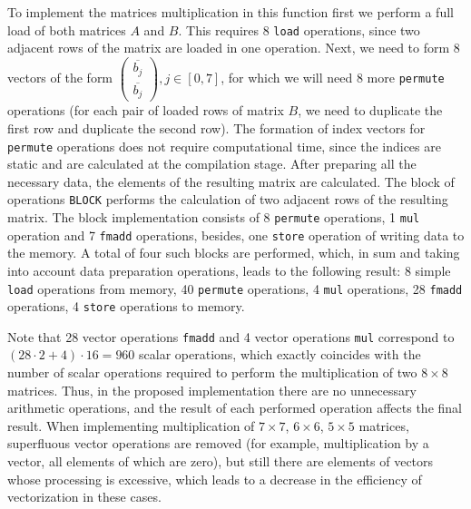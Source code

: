 \documentclass[
11pt,%
tightenlines,%
twoside,%
onecolumn,%
nofloats,%
nobibnotes,%
nofootinbib,%
superscriptaddress,%
noshowpacs,%
centertags]%
{revtex4}
\begin{document}
To implement the matrices multiplication in this function first we perform a full load of both matrices $A$ and $B$.
This requires 8 \texttt{load} operations, since two adjacent rows of the matrix are loaded in one operation.
Next, we need to form 8 vectors of the form $\begin{pmatrix} \overline{b_j} \\ \overline{b_j} \end{pmatrix}, j \in [0, 7]$, for which we will need 8 more \texttt{permute} operations (for each pair of loaded rows of matrix $B$, we need to duplicate the first row and duplicate the second row).
The formation of index vectors for \texttt{permute} operations does not require computational time, since the indices are static and are calculated at the compilation stage.
After preparing all the necessary data, the elements of the resulting matrix are calculated.
The block of operations \texttt{BLOCK} performs the calculation of two adjacent rows of the resulting matrix.
The block implementation consists of 8 \texttt{permute} operations, 1 \texttt{mul} operation and 7 \texttt{fmadd} operations, besides, one \texttt{store} operation of writing data to the memory.
A total of four such blocks are performed, which, in sum and taking into account data preparation operations, leads to the following result: 8 simple \texttt{load} operations from memory, 40 \texttt{permute} operations, 4 \texttt{mul} operations, 28 \texttt{fmadd} operations, 4 \texttt{store} operations to memory.

Note that 28 vector operations \texttt{fmadd} and 4 vector operations \texttt{mul} correspond to $(28 \cdot 2 + 4) \cdot 16 = 960$ scalar operations, which exactly coincides with the number of scalar operations required to perform the multiplication of two $8 \times 8$ matrices.
Thus, in the proposed implementation there are no unnecessary arithmetic operations, and the result of each performed operation affects the final result.
When implementing multiplication of $7 \times 7$, $6 \times 6$, $5 \times 5$ matrices, superfluous vector operations are removed (for example, multiplication by a vector, all elements of which are zero), but still there are elements of vectors whose processing is excessive, which leads to a decrease in the efficiency of vectorization in these cases.
\end{document}
